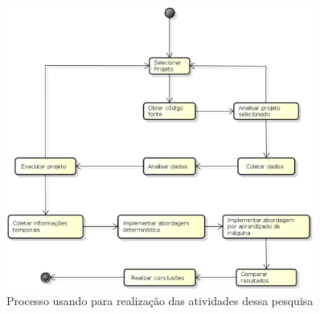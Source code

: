 \begin{figure}[h]
  \centering
  \includegraphics[width=0.9\textwidth]{figuras/planejamento_pesquisa.eps}
  \caption{Processo usando para realização das atividades dessa pesquisa}
  \label{fig:planejamento_pesquisa}
\end{figure}

